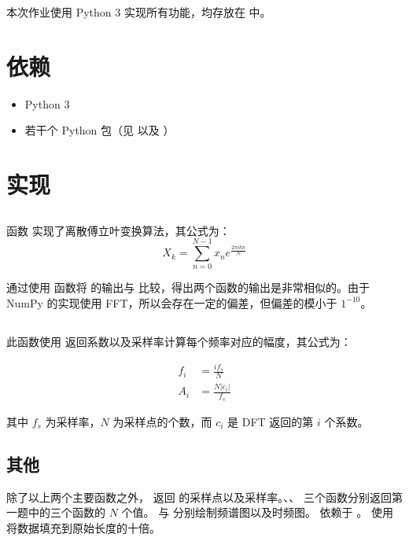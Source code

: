 本次作业使用 Python 3 实现所有功能，均存放在  中。
\section{依赖}

\begin{itemize}
    \item Python 3
    \item 若干个 Python 包（见  以及 ）
\end{itemize}

\section{实现}

\subsection{}

函数  实现了离散傅立叶变换算法，其公式为：$$X_k=\sum_{n=0}^{N-1}x_ne^{\frac{2\pi ikn}{N}}$$

通过使用  函数将  的输出与  比较，得出两个函数的输出是非常相似的。由于 NumPy 的实现使用 FFT，所以会存在一定的偏差，但偏差的模小于 $1^{-10}$。

\subsection{}

此函数使用  返回系数以及采样率计算每个频率对应的幅度，其公式为：

\begin{align*}
    f_i&=\frac{if_s}{N}\\
    A_i&=\frac{N|c_i|}{f_s}
\end{align*}

其中 $f_s$ 为采样率，$N$ 为采样点的个数，而 $c_i$ 是 DFT 返回的第 $i$ 个系数。

\subsection{其他}

除了以上两个主要函数之外， 返回  的采样点以及采样率。、、 三个函数分别返回第一题中的三个函数的 $N$ 个值。 与  分别绘制频谱图以及时频图。 依赖于 。 使用  将数据填充到原始长度的十倍。

